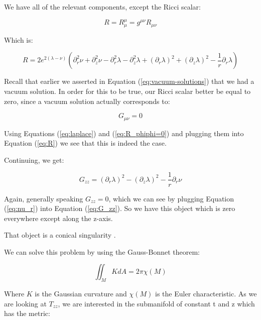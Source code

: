 \documentclass{article}
\begin{document}
We have all of the relevant components, except the Ricci scalar:

\begin{equation}
R=R_{\mu}^{\mu}=g^{\mu\nu}R_{\mu\nu}
\end{equation}

Which is:

\begin{equation}
R=2e^{2\left(\lambda-\nu\right)}\left(\partial^{2}_{r}\nu+\partial^{2}_{z}\nu-\partial^{2}_{r}\lambda-\partial^{2}_{z}\lambda+\left(\partial_{r}\lambda\right)^{2}+\left(\partial_{z}\lambda\right)^{2}-\frac{1}{r}\partial_{r}\lambda\right)\label{eq:R}
\end{equation}

Recall that earlier we asserted in Equation (\ref{eq:vacuum-solutions}) that we had a vacuum solution. In order for this to be true, our Ricci scalar better be equal to zero, since a vacuum solution actually corresponds to:

\begin{equation}
G_{\mu\nu}=0
\end{equation}

Using Equations (\ref{eq:laplace}) and (\ref{eq:R_phiphi=0}) and plugging them into Equation (\ref{eq:R}) we see that this is indeed the case.

Continuing, we get:

\begin{equation}
G_{zz}=\left(\partial_{r}\lambda\right)^{2}-\left(\partial_{z}\lambda\right)^{2}-\frac{1}{r}\partial_{r}\nu \label{eq:G_zz}
\end{equation}

Again, generally speaking $G_{zz}=0$, which we can see by plugging Equation (\ref{eq:nu_r}) into Equation (\ref{eq:G_zz}). So we have this object which is zero everywhere except along the z-axis.

That object is a conical singularity \cite{araujo_static_1995}.

We can solve this problem by using the Gauss-Bonnet theorem: \cite{weisstein_gauss-bonnet}

\begin{equation}
\iint_{M} KdA=2\pi\chi (M)\label{eq:Gauss-Bonnet}
\end{equation}

Where $K$ is the Gaussian curvature and $\chi (M)$ is the Euler characteristic. As we are looking at $T_{zz}$, we are interested in the submanifold of constant t and z which has the metric:
\end{document}
